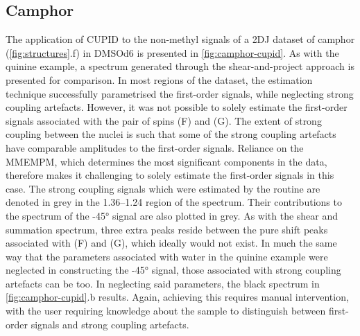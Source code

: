 \subsection{Camphor}
The application of \ac{CUPID} to the non-methyl signals of a \ac{2DJ}
dataset of camphor (\cref{fig:structures}.f) in \acs{DMSOd6} is presented
in \cref{fig:camphor-cupid}. As with the quinine example, a spectrum
generated through the shear-and-project approach is presented for
comparison. In most regions of the dataset, the estimation technique
successfully parametrised the first-order signals, while neglecting strong
coupling artefacts. However, it was not possible to solely estimate the
first-order signals associated with the pair of spins (F) and (G). The extent
of strong coupling between the nuclei is such that some of the strong coupling
artefacts have comparable amplitudes to the first-order signals. Reliance on
the
\ac{MMEMPM}, which determines the most significant components in
the data, therefore makes it challenging to solely estimate the first-order
signals in this case. The strong coupling signals which were estimated by the
routine are denoted in grey in the \SIrange{1.36}{1.24}{\partspermillion} region
of the spectrum. Their contributions to the spectrum of the \ang{-45} signal
are also plotted in grey. As with the shear and summation spectrum, three extra
peaks reside between the pure shift peaks associated with (F) and (G), which
ideally would not exist. In much the same way that the parameters associated
with water in the quinine example were neglected in constructing the \ang{-45}
signal, those associated with strong coupling artefacts can be too.
In neglecting said parameters, the black spectrum in \cref{fig:camphor-cupid}.b
results. Again, achieving this requires manual intervention, with the user
requiring knowledge about the sample to distinguish between first-order signals
and strong coupling artefacts.

